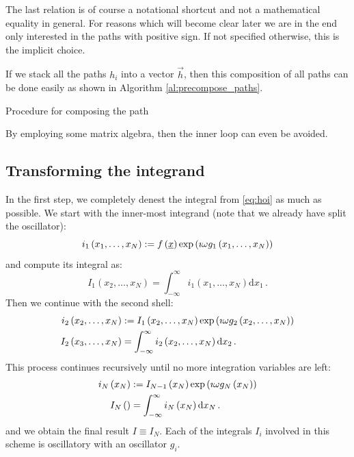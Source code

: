 \documentclass[a4paper,10pt]{article}
\begin{document}
The last relation is of course a notational shortcut and
not a mathematical equality in general. For reasons which
will become clear later we are in the end only interested
in the paths with positive sign. If not specified otherwise,
this is the implicit choice.

If we stack all the paths $h_i$ into a vector $\vec{h}$, then
this composition of all paths can be done easily as shown
in Algorithm \ref{al:precompose_paths}.
\begin{algorithm}
  \caption{Procedure for composing the path}
  \label{al:precompose_paths}
  \begin{algorithmic}
      \EndFor
    \EndFor
  \end{algorithmic}
\end{algorithm}
By employing some matrix algebra, then the inner loop
can even be avoided.


\subsection{Transforming the integrand}


In the first step, we completely denest the integral from
\eqref{eq:hoi} as much as possible.
We start with the inner-most integrand (note that we already
have split the oscillator):
\begin{equation}
  i_1\left(x_1,\ldots,x_N\right) := f\left(\underline{x}\right) \exp\left(\imath \omega g_1\left(x_1,\ldots,x_N\right)\right)
\end{equation}
and compute its integral as:
\begin{equation}
  I_1\left(x_2,\ldots,x_N\right) = \int_{-\infty}^\infty i_1\left(x_1,\ldots,x_N\right) \mathrm{d}x_1 \,.
\end{equation}
Then we continue with the second shell:
\begin{equation}
\begin{split}
  i_2\left(x_2,\ldots,x_N\right) & := I_1\left(x_2,\ldots,x_N\right) \exp\left(\imath \omega g_2\left(x_2,\ldots,x_N\right)\right) \\
  I_2\left(x_3,\ldots,x_N\right) & = \int_{-\infty}^\infty i_2\left(x_2,\ldots,x_N\right) \mathrm{d}x_2 \,.
\end{split}
\end{equation}
This process continues recursively until no more integration
variables are left:
\begin{equation}
\begin{split}
  i_N\left(x_N\right) & := I_{N-1}\left(x_N\right) \exp\left(\imath \omega g_N\left(x_N\right)\right) \\
  I_N\left(\right)    & = \int_{-\infty}^\infty i_N\left(x_N\right) \mathrm{d}x_N \,.
\end{split}
\end{equation}
and we obtain the final result $I \equiv I_N$. Each of the integrals $I_i$
involved in this scheme is oscillatory with an oscillator $g_i$.
\end{document}
